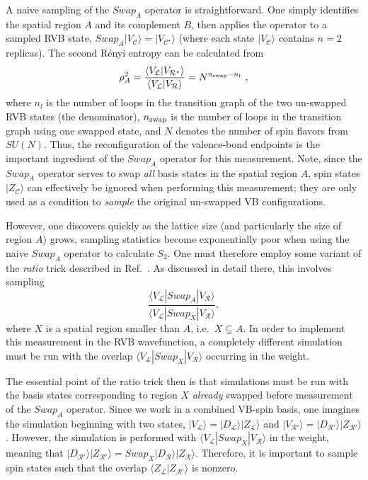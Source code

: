 \documentclass[11pt]{iopart}
\begin{document}
A naive sampling of the $Swap_A$ operator is straightforward.  One simply identifies the spatial region $A$ and its complement $B$, then applies the operator to a sampled RVB state, $Swap_A |V_{\mathcal C} \rangle =  |V_{\mathcal C^{\star}} \rangle$ (where each state $|V_{\mathcal C} \rangle$ contains $n=2$ replicas).  The second R\'enyi entropy can be calculated from \cite{swap}
\begin{equation}
	\rho_A^2
		= \frac{\langle V_{\mathcal{L}} | V_{\mathcal{R}^{\star}} \rangle}
			{\langle V_{\mathcal{L}} | V_{\mathcal{R}} \rangle} 
			 = N^{n_{\rm swap} - n_l}\ ,
\end{equation}
where $n_l$ is the number of loops in the transition graph of the two un-swapped RVB states (the denominator), $n_{\rm swap}$ is the number of loops in the transition graph using one swapped state, and $N$ denotes the number of spin flavors from $SU(N)$.  
Thus, the reconfiguration of the valence-bond endpoints is the important ingredient of the $Swap_A$ operator for this measurement.  Note, 
since the $Swap_A$ operator serves to swap {\it all} basis states in the spatial region $A$, spin states $|Z_{\mathcal C} \rangle$ can effectively be ignored when performing this measurement; they are only used as a condition to {\it sample} the original un-swapped VB configurations.

However, one discovers quickly as the lattice size (and particularly the size of region $A$) grows, sampling statistics become exponentially poor when using the naive $Swap_A$ operator to calculate $S_2$.  One must therefore employ some variant of the {\it ratio} trick described in  Ref.~\cite{swap}.  As discussed in detail there, this involves sampling 
\begin{equation}
 \frac{\langle V_{\mathcal{L}} | Swap_A | V_{\mathcal{R}} \rangle}
			{\langle V_{\mathcal{L}} | Swap_X | V_{\mathcal{R}} \rangle},
\end{equation}
where $X$ is a spatial region smaller than $A$, i.e.~$X \subsetneq A$.  In order to implement this measurement in the RVB wavefunction, a completely different simulation must be run with the overlap ${\langle V_{\mathcal{L}} | Swap_X | V_{\mathcal{R}} \rangle}$ occurring in the weight.  

The essential point of the ratio trick then is that simulations must be run with the basis states corresponding to region $X$ {\it already} swapped before measurement of the $Swap_A$ operator.  Since we work in a combined VB-spin basis, one imagines the simulation beginning with 
two states, $|V_{\mathcal L} \rangle = |D_{\mathcal L} \rangle | Z_{\mathcal L} \rangle$ and $|V_{\mathcal R'} \rangle = |D_{\mathcal R'}  \rangle | Z_{\mathcal R'} \rangle$.  However, the simulation is performed with ${\langle V_{\mathcal{L}} | Swap_X | V_{\mathcal{R}} \rangle}$ in the weight, 
meaning that $ |D_{\mathcal R'} \rangle | Z_{\mathcal R'} \rangle = Swap_X |D_{\mathcal R} \rangle | Z_{\mathcal R} \rangle  $.  Therefore, it is important to sample spin states such that the overlap $\langle Z_{\mathcal L} | Z_{\mathcal R '} \rangle$ is nonzero.  
\end{document}
